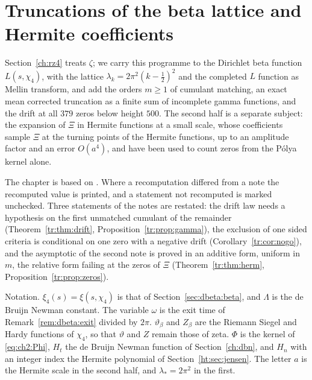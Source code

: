 \chapter{Truncations of the beta lattice and Hermite coefficients}\label{chap:tr}

Section~\ref{ch:rz4} treats $\zeta$; we carry this programme to the Dirichlet beta function $L(s,\chi_4)$, with the lattice $\lambda_k=2\pi^2(k-\frac12)^2$ and the completed $L$ function as Mellin transform, and add the orders $m\ge1$ of cumulant matching, an exact mean corrected truncation as a finite sum of incomplete gamma functions, and the drift at all $379$ zeros below height $500$. The second half is a separate subject: the expansion of $\Xi$ in Hermite functions at a small scale, whose coefficients sample $\Xi$ at the turning points of the Hermite functions, up to an amplitude factor and an error $O(a^4)$, and have been used to count zeros from the P\'olya kernel alone.

The chapter is based on \cite{P26trunc,P26hermite}. Where a recomputation differed from a note the recomputed value is printed, and a statement not recomputed is marked unchecked. Three statements of the notes are restated: the drift law needs a hypothesis on the first unmatched cumulant of the remainder (Theorem~\ref{tr:thm:drift}, Proposition~\ref{tr:prop:gamma}), the exclusion of one sided criteria is conditional on one zero with a negative drift (Corollary~\ref{tr:cor:nogo}), and the asymptotic of the second note is proved in an additive form, uniform in $m$, the relative form failing at the zeros of $\Xi$ (Theorem~\ref{tr:thm:herm}, Proposition~\ref{tr:prop:zeros}).

Notation. $\xi_4(s)=\xi(s,\chi_4)$ is that of Section~\ref{sec:dbeta:beta}, and $\Lambda$ is the de Bruijn Newman constant. The variable $\omega$ is the exit time of Remark~\ref{rem:dbeta:exit} divided by $2\pi$. $\vartheta_\beta$ and $Z_\beta$ are the Riemann Siegel and Hardy functions of $\chi_4$, so that $\vartheta$ and $Z$ remain those of zeta. $\Phi$ is the kernel of \eqref{eq:ch2:Phi}, $H_t$ the de Bruijn Newman function of Section~\ref{ch:dbn}, and $H_n$ with an integer index the Hermite polynomial of Section~\ref{ht:sec:jensen}. The letter $a$ is the Hermite scale in the second half, and $\lambda_*=2\pi^2$ in the first.

